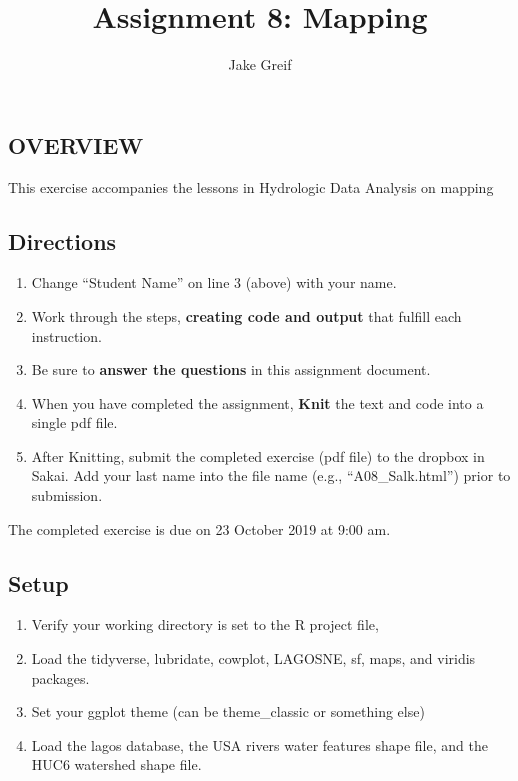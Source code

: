\documentclass[]{article}
\title{Assignment 8: Mapping}
\author{Jake Greif}
\date{}
\providecommand{\tightlist}{%
  \setlength{\itemsep}{0pt}\setlength{\parskip}{0pt}}
\begin{document}
\maketitle

\hypertarget{overview}{%
\subsection{OVERVIEW}\label{overview}}

This exercise accompanies the lessons in Hydrologic Data Analysis on
mapping

\hypertarget{directions}{%
\subsection{Directions}\label{directions}}

\begin{enumerate}
\def\labelenumi{\arabic{enumi}.}
\tightlist
\item
  Change ``Student Name'' on line 3 (above) with your name.
\item
  Work through the steps, \textbf{creating code and output} that fulfill
  each instruction.
\item
  Be sure to \textbf{answer the questions} in this assignment document.
\item
  When you have completed the assignment, \textbf{Knit} the text and
  code into a single pdf file.
\item
  After Knitting, submit the completed exercise (pdf file) to the
  dropbox in Sakai. Add your last name into the file name (e.g.,
  ``A08\_Salk.html'') prior to submission.
\end{enumerate}

The completed exercise is due on 23 October 2019 at 9:00 am.

\hypertarget{setup}{%
\subsection{Setup}\label{setup}}

\begin{enumerate}
\def\labelenumi{\arabic{enumi}.}
\tightlist
\item
  Verify your working directory is set to the R project file,
\item
  Load the tidyverse, lubridate, cowplot, LAGOSNE, sf, maps, and viridis
  packages.
\item
  Set your ggplot theme (can be theme\_classic or something else)
\item
  Load the lagos database, the USA rivers water features shape file, and
  the HUC6 watershed shape file.
\end{enumerate}
\end{document}
